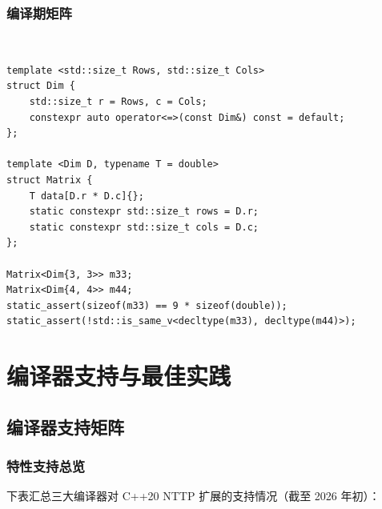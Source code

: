\documentclass[12pt,a4paper,fontset=fandol]{ctexbook}
\newcommand{\cppxxlabel}[1]{%
  \tcbox[on line,colback=cpp20bg,colframe=cpp20bg,
    boxrule=0pt,arc=1pt,left=2pt,right=2pt,top=1pt,bottom=1pt,
    colupper=white,fontupper=\scriptsize\bfseries]{#1}}
\newcommand{\cpp}[1]{C++#1}
\begin{document}
\section{编译期矩阵}

\cppxxlabel{C++20}\ \begin{lstlisting}
template <std::size_t Rows, std::size_t Cols>
struct Dim {
    std::size_t r = Rows, c = Cols;
    constexpr auto operator<=>(const Dim&) const = default;
};

template <Dim D, typename T = double>
struct Matrix {
    T data[D.r * D.c]{};
    static constexpr std::size_t rows = D.r;
    static constexpr std::size_t cols = D.c;
};

Matrix<Dim{3, 3>> m33;
Matrix<Dim{4, 4>> m44;
static_assert(sizeof(m33) == 9 * sizeof(double));
static_assert(!std::is_same_v<decltype(m33), decltype(m44)>);
\end{lstlisting}

\part{编译器支持与最佳实践}

\chapter{编译器支持矩阵}

\section{特性支持总览}

下表汇总三大编译器对 \cpp{20} NTTP 扩展的支持情况（截至 2026 年初）：
\end{document}
